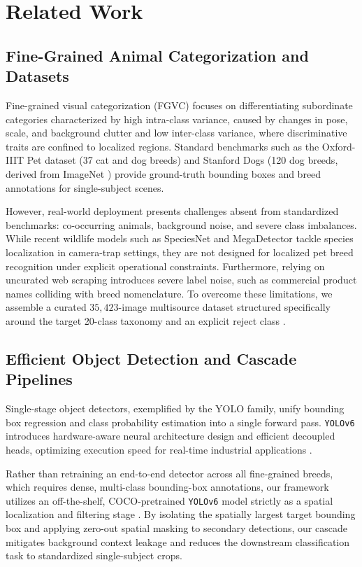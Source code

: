 \section{Related Work}
\label{sec:02_related_work}

\subsection{Fine-Grained Animal Categorization and Datasets}
Fine-grained visual categorization (FGVC) focuses on differentiating subordinate categories characterized by high intra-class variance, caused by changes in pose, scale, and background clutter and low inter-class variance, where discriminative traits are confined to localized regions. Standard benchmarks such as the Oxford-IIIT Pet dataset \cite{parkhi2012catsdogs} (37 cat and dog breeds) and Stanford Dogs \cite{khosla2011novel} (120 dog breeds, derived from ImageNet \cite{deng2009imagenet}) provide ground-truth bounding boxes and breed annotations for single-subject scenes. 

However, real-world deployment presents challenges absent from standardized benchmarks: co-occurring animals, background noise, and severe class imbalances. While recent wildlife models such as SpeciesNet \cite{speciesnet2025} and MegaDetector \cite{megadetector2026} tackle species localization in camera-trap settings, they are not designed for localized pet breed recognition under explicit operational constraints. Furthermore, relying on uncurated web scraping introduces severe label noise, such as commercial product names colliding with breed nomenclature. To overcome these limitations, we assemble a curated $35,423$-image multisource dataset structured specifically around the target 20-class taxonomy and an explicit reject class \cite{parkhi2012catsdogs, khosla2011novel, cat_api, unsplash, pixabay}.

\subsection{Efficient Object Detection and Cascade Pipelines}
Single-stage object detectors, exemplified by the YOLO family, unify bounding box regression and class probability estimation into a single forward pass. \texttt{YOLOv6} introduces hardware-aware neural architecture design and efficient decoupled heads, optimizing execution speed for real-time industrial applications \cite{li2022yolov6}.

Rather than retraining an end-to-end detector across all fine-grained breeds, which requires dense, multi-class bounding-box annotations, our framework utilizes an off-the-shelf, COCO-pretrained \texttt{YOLOv6} model strictly as a spatial localization and filtering stage \cite{li2022yolov6, lin2014coco}. By isolating the spatially largest target bounding box and applying zero-out spatial masking to secondary detections, our cascade mitigates background context leakage and reduces the downstream classification task to standardized single-subject crops.

